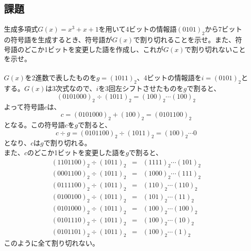 \documentclass[a4j]{celb-report}
\begin{document}
\subsection{課題}
生成多項式$ G \left( x \right) = x ^3 + x + 1 $を用いて4ビットの情報語$ \left( 0101 \right) _2 $から7ビットの符号語を生成するとき、符号語が$ G \left( x \right) $で割り切れることを示せ。また、符号語のどこか1ビットを変更した語を作成し、これが$ G \left( x \right) $で割り切れないことを示せ。\\
\\
$ G \left( x \right) $を2進数で表したものを$ g = \left( 1011 \right) _2 $、4ビットの情報語を$ i = \left( 0101 \right) _2 $とする。$ G \left( x \right) $は3次式なので、$ i $を3回左シフトさせたものを$ g $で割ると、
\begin{equation}
	\left( 0101000 \right) _2 \div \left( 1011 \right) _2 = \left( 100 \right) _2 \cdots \left( 100 \right) _2 \nonumber
\end{equation}
よって符号語$ c $は、
\begin{equation}
	c = \left( 0101000 \right) _2 + \left( 100 \right) _2 = \left( 0101100 \right) _2 \nonumber
\end{equation}
となる。この符号語$ c $を$ g $で割ると、
\begin{equation}
	c \div g = \left( 0101100 \right) _2 \div \left( 1011 \right) _2 = \left( 100 \right) _2 \cdots 0 \nonumber
\end{equation}
となり、$ c $は$ g $で割り切れる。\\
また、$ c $のどこか1ビットを変更した語を$ g $で割ると、
\begin{eqnarray}
	\left( 1101100 \right) _2 \div \left( 1011 \right) _2 & = & \left( 1111 \right) _2 \cdots \left( 101 \right) _2 \nonumber \\
	\left( 0001100 \right) _2 \div \left( 1011 \right) _2 & = & \left( 1000 \right) _2 \cdots \left( 111 \right) _2 \nonumber \\
	\left( 0111100 \right) _2 \div \left( 1011 \right) _2 & = & \left( 110 \right) _2 \cdots \left( 110 \right) _2 \nonumber \\
	\left( 0100100 \right) _2 \div \left( 1011 \right) _2 & = & \left( 101 \right) _2 \cdots \left( 11 \right) _2 \nonumber \\
	\left( 0101000 \right) _2 \div \left( 1011 \right) _2 & = & \left( 100 \right) _2 \cdots \left( 100 \right) _2 \nonumber \\
	\left( 0101110 \right) _2 \div \left( 1011 \right) _2 & = & \left( 100 \right) _2 \cdots \left( 10 \right) _2 \nonumber \\
	\left( 0101101 \right) _2 \div \left( 1011 \right) _2 & = & \left( 100 \right) _2 \cdots \left( 1 \right) _2 \nonumber
\end{eqnarray}
このように全て割り切れない。
\end{document}
